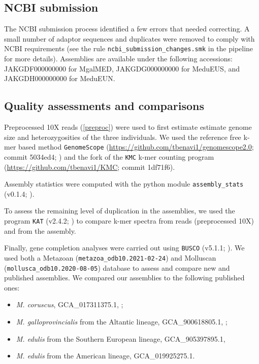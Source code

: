 \documentclass[11pt, a4paper]{article}
\begin{document}
\subsection{NCBI submission}

The NCBI submission process identified a few errors that needed correcting.
A small number of adaptor sequences and duplicates were removed to comply with NCBI requirements
(see the rule \texttt{ncbi\_submission\_changes.smk} in the pipeline for more details).
Assemblies are available under the following accessions: 
JAKGDF000000000 for MgalMED,
JAKGDG000000000 for MeduEUS,
and JAKGDH000000000 for MeduEUN.


\subsection{Quality assessments and comparisons}

Preprocessed 10X reads (\cref{preproc}) were used to first estimate estimate genome size and heterozygosities of the three individuals.
We used the reference free k-mer based method \texttt{GenomeScope} (\url{https://github.com/tbenavi1/genomescope2.0}; commit 5034ed4; \cite{Ranallo-Benavidez2020}) and the fork of the \texttt{KMC} k-mer  counting program (\url{https://github.com/tbenavi1/KMC}; commit 1df71f6).

Assembly statistics were computed with the python module \texttt{assembly\_stats} (v0.1.4; \cite{Trizna2020}).

To assess the remaining level of duplication in the assemblies, we used the program \texttt{KAT} (v2.4.2; \cite{Mapleson2017}) to compare k-mer spectra from reads (preprocessed 10X) and from the assembly.

Finally, gene completion analyses were carried out using \texttt{BUSCO} (v5.1.1; \cite{Manni2021}).
We used both a Metazoan (\texttt{metazoa\_odb10.2021-02-24}) and Molluscan (\texttt{mollusca\_odb10.2020-08-05}) database to assess and compare new and published assemblies.
We compared our assemblies to the following published ones:
\begin{itemize}
	\item \textit{M. coruscus}, GCA\_017311375.1, \textcite{Yang2021};
	\item \textit{M. galloprovincialis} from the Altantic lineage, GCA\_900618805.1, \textcite{Gerdol2020};
	\item \textit{M. edulis} from the Southern European lineage, GCA\_905397895.1, \textcite{Corrochano-Fraile2021}
	\item \textit{M. edulis} from the American lineage, GCA\_019925275.1.
\end{itemize}
\end{document}
